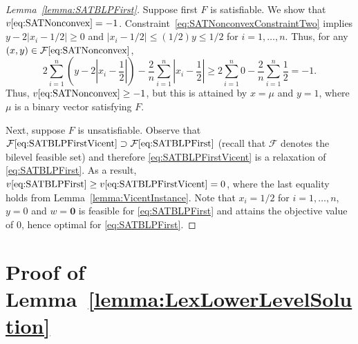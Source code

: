 \documentclass[runningheads,orivec]{llncs}
\newcommand{\MacroColor}[1]{#1}
\newcommand{\ZeroVector}{\mathbf{0}}
\newcommand{\NVariables}{\MacroColor{n}}
\newcommand{\OptValFunc}{\MacroColor{v}}
\newcommand{\FeasSolSet}{\MacroColor{\mathcal{F}}}
\newcommand{\SATBooleanFormula}{\MacroColor{F}}
\newcommand{\BinaryVector}{\MacroColor{\mu}}
\begin{document}
\begin{appendix}
\begin{proof}[Lemma~\ref{lemma:SATBLPFirst}]
Suppose first $\SATBooleanFormula$ is satisfiable.
We show that $\OptValFunc\eqref{eq:SATNonconvex} = -1$.
Constraint~\eqref{eq:SATNonconvexConstraintTwo} implies $y - 2 |x_i - 1/2| \ge 0$ and $|x_i - 1/2| \le (1/2) y \le 1/2$ for $i = 1, \ldots, \NVariables$.
Thus, for any $(x, y) \in \FeasSolSet\eqref{eq:SATNonconvex}$,
$$
2 \sum_{i = 1}^{n} \left(y - 2 \left|x_i - \frac{1}{2}\right| \right) - \frac{2}{n} \sum_{i = 1}^n \left|x_i - \frac{1}{2}\right|
\ge 2 \sum_{i = 1}^{\NVariables} 0 - \frac{2}{n} \sum_{i = 1}^{\NVariables} \frac{1}{2} = -1.
$$
Thus, $\OptValFunc\eqref{eq:SATNonconvex} \ge -1$, but this is attained by $x = \BinaryVector$ and $y = 1$, where $\BinaryVector$ is a binary vector satisfying $\SATBooleanFormula$.

Next, suppose $\SATBooleanFormula$ is unsatisfiable.
Observe that $\FeasSolSet\eqref{eq:SATBLPFirstVicent} \supset \FeasSolSet\eqref{eq:SATBLPFirst}$ (recall that $\FeasSolSet$ denotes the bilevel feasible set) and therefore \eqref{eq:SATBLPFirstVicent} is a relaxation of \eqref{eq:SATBLPFirst}.
As a result, $\OptValFunc\eqref{eq:SATBLPFirst} \ge \OptValFunc\eqref{eq:SATBLPFirstVicent} = 0$, where the last equality holds from Lemma~\ref{lemma:VicentInstance}.
Note that $x_i = 1/2$ for $i = 1, \ldots, \NVariables$, $y = 0$ and $w = \ZeroVector$ is feasible for \eqref{eq:SATBLPFirst} and attains the objective value of $0$, hence optimal for \eqref{eq:SATBLPFirst}.
\end{proof}

\section{Proof of Lemma~\ref{lemma:LexLowerLevelSolution}}
\label{sec:ProofOfLemmaLexLowerLevelSolution}


\end{appendix}
\end{document}
